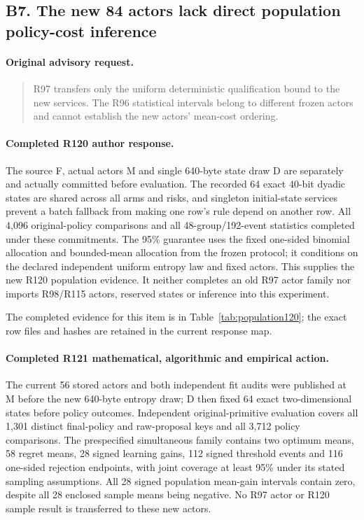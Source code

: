 \subsection{B7. The new 84 actors lack direct population policy-cost inference}
\label{response122:B7}

\paragraph{Original advisory request.}
\begin{quote}
R97 transfers only the uniform deterministic qualification bound to the new services. The R96 statistical intervals belong to different frozen actors and cannot establish the new actors' mean-cost ordering.
\end{quote}

\paragraph{Completed R120 author response.}
The source F, actual actors M and single 640-byte state draw D are separately and actually committed before evaluation. The recorded 64 exact 40-bit dyadic states are shared across all arms and risks, and singleton initial-state services prevent a batch fallback from making one row's rule depend on another row. All 4,096 original-policy comparisons and all 48-group/192-event statistics completed under these commitments. The 95\% guarantee uses the fixed one-sided binomial allocation and bounded-mean allocation from the frozen protocol; it conditions on the declared independent uniform entropy law and fixed actors. This supplies the new R120 population evidence. It neither completes an old R97 actor family nor imports R98/R115 actors, reserved states or inference into this experiment.

The completed evidence for this item is in Table~\ref{tab:population120}; the exact row files and hashes are retained in the current response map.

\paragraph{Completed R121 mathematical, algorithmic and empirical action.}
The current 56 stored actors and both independent fit audits were published at M before the new 640-byte entropy draw; D then fixed 64 exact two-dimensional states before policy outcomes. Independent original-primitive evaluation covers all 1,301 distinct final-policy and raw-proposal keys and all 3,712 policy comparisons. The prespecified simultaneous family contains two optimum means, 58 regret means, 28 signed learning gains, 112 signed threshold events and 116 one-sided rejection endpoints, with joint coverage at least 95\% under its stated sampling assumptions. All 28 signed population mean-gain intervals contain zero, despite all 28 enclosed sample means being negative. No R97 actor or R120 sample result is transferred to these new actors.

